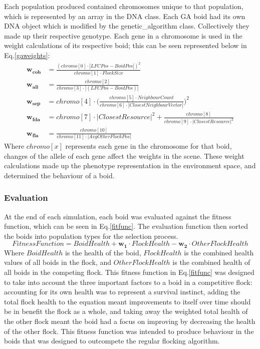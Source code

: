Each population produced contained chromosomes unique to that population, which is represented by an array in the DNA class. Each GA boid had its own DNA object which is modified by the genetic\_algorithm class. Collectively they made up their respective genotype. Each gene in a chromosome is used in the weight calculations of its respective boid; this can be seen represented below in Eq.\ref{gaweights}:
\begin{equation}
\begin{split}
\boldsymbol{w_{coh}} &= \frac{(chromo[0] \cdot |LFCPos - BoidPos|)^2} {chromo[1] \cdot FlockSize} \\
\boldsymbol{w_{ali}} &= \frac{chromo[2]} {chromo[3] \cdot |(LFCPos - BoidPos)|} \\
\boldsymbol{w_{sep}} &= chromo[4] \cdot \Big(\frac{chromo[5] \cdot NeighbourCount} {chromo[6] \cdot |ClosestNeighbourVector|}\Big)^2 \\
\boldsymbol{w_{fda}} &= chromo[7] \cdot |ClosestResource|^2 + \frac{chromo[8]} {chromo[9] \cdot |ClosestResource|^2} \\
\boldsymbol{w_{fla}} &= \frac{chromo[10]} {chromo[11] \cdot |AvgOtherFlockPos|} 
\end{split}
\label{gaweights}
\end{equation}
Where $chromo[x]$ represents each gene in the chromosome for that boid, changes of the allele of each gene affect the weights in the scene.
These weight calculations made up the phenotype representation in the environment space, and determined the behaviour of a boid. 


\subsubsection{Evaluation}
At the end of each simulation, each boid was evaluated against the fitness function, which can be seen in Eq.\ref{fitfunc}. The evaluation function then sorted the boids into population types for the selection process. 
\begin{equation}
Fitness Function = BoidHealth + \boldsymbol{w_{1}} \cdot FlockHealth - \boldsymbol{w_{2}} \cdot OtherFlockHealth
\label{fitfunc}
\end{equation}
Where $BoidHealth$ is the health of the boid, $FlockHealth$ is the combined health values of all boids in the flock, and $OtherFlockHealth$ is the combined health of all boids in the competing flock.
This fitness function in Eq.\ref{fitfunc} was designed to take into account the three important factors to a boid in a competitive flock: accounting for its own health was to represent a survival instinct, adding the total flock health to the equation meant improvements to itself over time should be in benefit the flock as a whole, and taking away the weighted total health of the other flock meant the boid had a focus on improving by decreasing the health of the other flock. This fitness function was intended to produce behaviour in the boids that was designed to outcompete the regular flocking algorithm.

